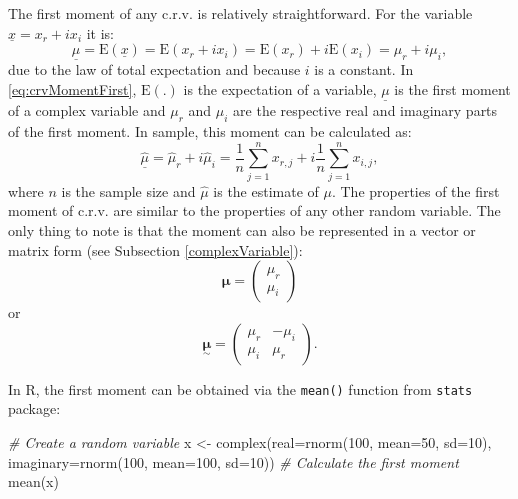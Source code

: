 \documentclass[
]{book}
\newenvironment{Shaded}{\begin{snugshade}}{\end{snugshade}}
\newcommand{\AttributeTok}[1]{\textcolor[rgb]{0.77,0.63,0.00}{#1}}
\newcommand{\CommentTok}[1]{\textcolor[rgb]{0.56,0.35,0.01}{\textit{#1}}}
\newcommand{\DecValTok}[1]{\textcolor[rgb]{0.00,0.00,0.81}{#1}}
\newcommand{\FunctionTok}[1]{\textcolor[rgb]{0.00,0.00,0.00}{#1}}
\newcommand{\NormalTok}[1]{#1}
\newcommand{\OtherTok}[1]{\textcolor[rgb]{0.56,0.35,0.01}{#1}}
\begin{document}
The first moment of any c.r.v. is relatively straightforward. For the variable \(\underline{x}=x_r+ix_i\) it is:
\begin{equation}
    \underline{\mu} = \mathrm{E}(\underline{x}) = \mathrm{E}(x_r + i x_i) = \mathrm{E}(x_r) + i \mathrm{E}(x_i) = \mu_{r} + i \mu_{i},
    \label{eq:crvMomentFirst}
\end{equation}
due to the law of total expectation and because \(i\) is a constant. In \eqref{eq:crvMomentFirst}, \(\mathrm{E}(.)\) is the expectation of a variable, \(\underline{\mu}\) is the first moment of a complex variable and \(\mu_{r}\) and \(\mu_{i}\) are the respective real and imaginary parts of the first moment. In sample, this moment can be calculated as:
\begin{equation}
    \underline{\hat{\mu}} = \hat{\mu}_{r} + i \hat{\mu}_{i} = \frac{1}{n}\sum_{j=1}^n x_{r,j} + i \frac{1}{n}\sum_{j=1}^n x_{i,j},
    \label{eq:crvMomentFirstSample}
\end{equation}
where \(n\) is the sample size and \(\hat{\mu}\) is the estimate of \(\mu\). The properties of the first moment of c.r.v. are similar to the properties of any other random variable. The only thing to note is that the moment can also be represented in a vector or matrix form (see Subsection \ref{complexVariable}):
\begin{equation}
    \boldsymbol{\mu} = \begin{pmatrix} \mu_{r} \\ \mu_{i} \end{pmatrix} 
    \label{eq:crvMomentsVector}
\end{equation}
or
\begin{equation}
    \underset{\sim}{\boldsymbol{\mu}} = \begin{pmatrix} \mu_{r} & - \mu_{i} \\ \mu_{i} & \mu_{r} \end{pmatrix} .
    \label{eq:crvMomentsMatrix}
\end{equation}

In R, the first moment can be obtained via the \texttt{mean()} function from \texttt{stats} package:

\begin{Shaded}
\begin{Highlighting}[]
\CommentTok{\# Create a random variable}
\NormalTok{x }\OtherTok{\textless{}{-}} \FunctionTok{complex}\NormalTok{(}\AttributeTok{real=}\FunctionTok{rnorm}\NormalTok{(}\DecValTok{100}\NormalTok{, }\AttributeTok{mean=}\DecValTok{50}\NormalTok{, }\AttributeTok{sd=}\DecValTok{10}\NormalTok{),}
             \AttributeTok{imaginary=}\FunctionTok{rnorm}\NormalTok{(}\DecValTok{100}\NormalTok{, }\AttributeTok{mean=}\DecValTok{100}\NormalTok{, }\AttributeTok{sd=}\DecValTok{10}\NormalTok{))}
\CommentTok{\# Calculate the first moment}
\FunctionTok{mean}\NormalTok{(x)}
\end{Highlighting}
\end{Shaded}
\end{document}
